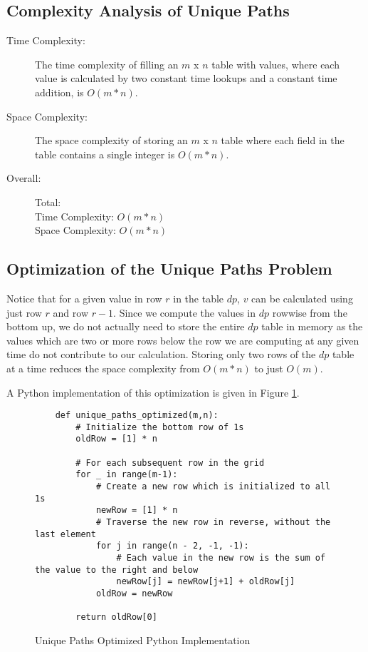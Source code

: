 \subsection{Complexity Analysis of Unique Paths}

\begin{description}
    \item[Time Complexity:]
        The time complexity of filling an $m$ x $n$ table with values,
        where each value is calculated by two constant time lookups and a constant time addition, is $O(m * n)$.
        
    \item[Space Complexity:] 
        The space complexity of storing an $m$ x $n$ table where each field in the table contains a single integer is $O(m * n)$.

    \item[Overall:] Total:\\
        Time Complexity: $O(m * n)$\\
        Space Complexity: $O(m * n)$
    
\end{description}

\subsection{Optimization of the Unique Paths Problem}
Notice that for a given value in row $r$ in the table $dp$, $v$ can be calculated using just row $r$ and row $r-1$.
Since we compute the values in $dp$ rowwise from the bottom up, we do not actually need to store the entire $dp$ table in memory as the values which are two or more rows below the row we are computing at any given time do not contribute to our calculation.
Storing only two rows of the $dp$ table at a time reduces the space complexity from $O(m * n)$ to just $O(m)$.

A Python implementation of this optimization is given in Figure \ref{fig:unique-paths-optimized}.

\begin{figure}[H]
    \centering
    \begin{lstlisting}
    def unique_paths_optimized(m,n):
        # Initialize the bottom row of 1s
        oldRow = [1] * n
    
        # For each subsequent row in the grid
        for _ in range(m-1):
            # Create a new row which is initialized to all 1s
            newRow = [1] * n
            # Traverse the new row in reverse, without the last element
            for j in range(n - 2, -1, -1):
                # Each value in the new row is the sum of the value to the right and below
                newRow[j] = newRow[j+1] + oldRow[j]
            oldRow = newRow
    
        return oldRow[0]
    \end{lstlisting}
    \caption{Unique Paths Optimized Python Implementation}
    \label{fig:unique-paths-optimized}
\end{figure}